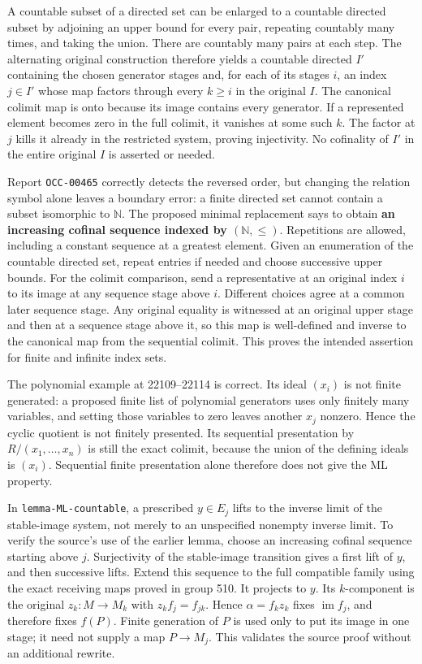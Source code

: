 A countable subset of a directed set can be enlarged to a countable directed subset by adjoining an upper bound for every pair, repeating countably many times, and taking the union. There are countably many pairs at each step. The alternating original construction therefore yields a countable directed \(I'\) containing the chosen generator stages and, for each of its stages \(i\), an index \(j\in I'\) whose map factors through every \(k\geq i\) in the original \(I\). The canonical colimit map is onto because its image contains every generator. If a represented element becomes zero in the full colimit, it vanishes at some such \(k\). The factor at \(j\) kills it already in the restricted system, proving injectivity. No cofinality of \(I'\) in the entire original \(I\) is asserted or needed.

Report \texttt{OCC-00465} correctly detects the reversed order, but changing the relation symbol alone leaves a boundary error: a finite directed set cannot contain a subset isomorphic to \(\mathbb N\). The proposed minimal replacement says to obtain \textbf{an increasing cofinal sequence indexed by \((\mathbb N,\leq)\)}. Repetitions are allowed, including a constant sequence at a greatest element. Given an enumeration of the countable directed set, repeat entries if needed and choose successive upper bounds. For the colimit comparison, send a representative at an original index \(i\) to its image at any sequence stage above \(i\). Different choices agree at a common later sequence stage. Any original equality is witnessed at an original upper stage and then at a sequence stage above it, so this map is well-defined and inverse to the canonical map from the sequential colimit. This proves the intended assertion for finite and infinite index sets.

The polynomial example at 22109--22114 is correct. Its ideal \((x_i)\) is not finite generated: a proposed finite list of polynomial generators uses only finitely many variables, and setting those variables to zero leaves another \(x_j\) nonzero. Hence the cyclic quotient is not finitely presented. Its sequential presentation by \(R/(x_1,\ldots,x_n)\) is still the exact colimit, because the union of the defining ideals is \((x_i)\). Sequential finite presentation alone therefore does not give the ML property.

In \texttt{lemma-ML-countable}, a prescribed \(y\in E_j\) lifts to the inverse limit of the stable-image system, not merely to an unspecified nonempty inverse limit. To verify the source's use of the earlier lemma, choose an increasing cofinal sequence starting above \(j\). Surjectivity of the stable-image transition gives a first lift of \(y\), and then successive lifts. Extend this sequence to the full compatible family using the exact receiving maps proved in group 510. It projects to \(y\). Its \(k\)-component is the original \(z_k:M\to M_k\) with \(z_k f_j=f_{jk}\). Hence \(\alpha=f_kz_k\) fixes \(\operatorname{im}f_j\), and therefore fixes \(f(P)\). Finite generation of \(P\) is used only to put its image in one stage; it need not supply a map \(P\to M_j\). This validates the source proof without an additional rewrite.

